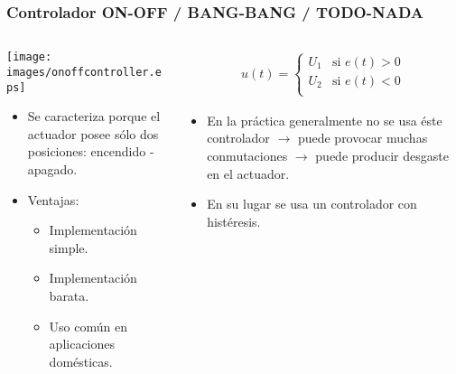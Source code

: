 \documentclass[aspectratio=169,handout]{beamer}
\theoremstyle{definition}
\theoremstyle{plain}
\theoremstyle{remark}
\begin{document}
\begin{frame}[<+->]\frametitle{Controlador ON-OFF / BANG-BANG / TODO-NADA}
\begin{columns}
  \begin{column}{0.5\textwidth}
    \vspace*{5mm}
    \texttt{[image: images/onoffcontroller.eps]}
    \vspace*{-5mm}
    \begin{itemize}
      \item Se caracteriza porque el actuador posee sólo dos posiciones: encendido - apagado.
      \item Ventajas:
      \begin{itemize}
        \item Implementación simple.
        \item Implementación barata.
        \item Uso común en aplicaciones domésticas.
      \end{itemize}
    \end{itemize}
  \end{column} 
  \begin{column}{0.5\textwidth}
    \begin{align*}
      u(t) =
      \begin{cases}
        U_1 & \text{si } e(t) > 0\\
        U_2 & \text{si } e(t) < 0\\
      \end{cases}
    \end{align*}
    \begin{itemize}
      \item En la práctica generalmente no se usa éste controlador $\rightarrow$ puede provocar muchas conmutaciones $\rightarrow$ puede producir desgaste en el actuador.
      \item En su lugar se usa un controlador con histéresis.
    \end{itemize}
  \end{column} 
\end{columns}
\end{frame}
\end{document}
